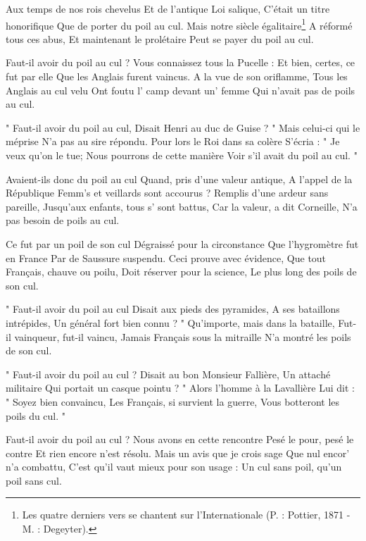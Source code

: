 \beginverse
Aux temps de nos rois chevelus
Et de l'antique Loi salique,
C'était un titre honorifique
Que de porter du poil au cul.
Mais notre siècle égalitaire\footnote {Les quatre derniers vers se chantent sur l'Internationale (P. : Pottier, 1871 - M. : Degeyter).}
A réformé tous ces abus,
Et maintenant le prolétaire
Peut se payer du poil au cul.
\endverse

\beginverse
Faut-il avoir du poil au cul ?
Vous connaissez tous la Pucelle :
Et bien, certes, ce fut par elle
Que les Anglais furent vaincus.
A la vue de son oriflamme,
Tous les Anglais au cul velu
Ont foutu l' camp devant un' femme
Qui n'avait pas de poils au cul.
\endverse

\beginverse
" Faut-il avoir du poil au cul,
Disait Henri au duc de Guise ? "
Mais celui-ci qui le méprise
N'a pas au sire répondu.
Pour lors le Roi dans sa colère
S'écria : " Je veux qu'on le tue;
Nous pourrons de cette manière
Voir s'il avait du poil au cul. "
\endverse

\beginverse
Avaient-ils donc du poil au cul
Quand, pris d'une valeur antique,
A l'appel de la République
Femm's et veillards sont accourus ?
Remplis d'une ardeur sans pareille,
Jusqu'aux enfants, tous s' sont battus,
Car la valeur, a dit Corneille,
N'a pas besoin de poils au cul.
\endverse

\beginverse
Ce fut par un poil de son cul
Dégraissé pour la circonstance
Que l'hygromètre fut en France
Par de Saussure suspendu.
Ceci prouve avec évidence,
Que tout Français, chauve ou poilu,
Doit réserver pour la science,
Le plus long des poils de son cul.
\endverse

\beginverse
" Faut-il avoir du poil au cul
Disait aux pieds des pyramides,
A ses bataillons intrépides,
Un général fort bien connu ? "
Qu'importe, mais dans la bataille,
Fut-il vainqueur, fut-il vaincu,
Jamais Français sous la mitraille
N'a montré les poils de son cul.
\endverse

\beginverse
" Faut-il avoir du poil au cul ?
Disait au bon Monsieur Fallière,
Un attaché militaire
Qui portait un casque pointu ? "
Alors l'homme à la Lavallière
Lui dit : " Soyez bien convaincu,
Les Français, si survient la guerre,
Vous botteront les poils du cul. "
\endverse

\beginverse
Faut-il avoir du poil au cul ?
Nous avons en cette rencontre
Pesé le pour, pesé le contre
Et rien encore n'est résolu.
Mais un avis que je crois sage
Que nul encor' n'a combattu,
C'est qu'il vaut mieux pour son usage :
Un cul sans poil, qu'un poil sans cul.
\endverse

\endsong